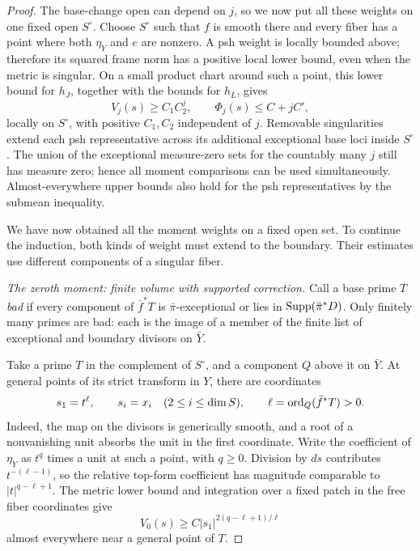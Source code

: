 \begin{proof}
The base-change open can depend on \(j\), so we now put all these
weights on one fixed open \(S^\circ\). Choose \(S^\circ\) such that
\(f\) is smooth there and every fiber has a point where both
\(\eta_Y\) and \(e\) are nonzero. A psh weight is locally bounded above;
therefore its squared frame norm has a positive local lower bound,
even when the metric is singular. On a small product chart around
such a point, this lower bound for \(h_J\), together with the
bounds for \(h_L\), gives
\begin{equation}\label{eq:common-open}
 V_j(s)\ge C_1C_2^j,\qquad \Phi_j(s)\le C+jC',
\end{equation}
locally on \(S^\circ\), with positive \(C_1,C_2\) independent of \(j\).
Removable singularities extend each psh representative across its
additional exceptional base loci inside \(S^\circ\).
The union of the exceptional measure-zero sets for the countably many
\(j\) still has measure zero; hence all moment comparisons can be used
simultaneously. Almost-everywhere upper bounds also hold for the psh
representatives by the submean inequality.

We have now obtained all the moment weights on a fixed open set.
To continue the induction, both kinds of weight must extend to the
boundary. Their estimates use different components of a singular fiber.

\medskip\noindent
\emph{The zeroth moment: finite volume with supported correction.}
Call a base prime \(T\) \emph{bad} if every component of
\(\bar f^*T\) is \(\bar\pi\)-exceptional or lies in
\(\operatorname{Supp}(\bar\pi^*D)\). Only finitely many primes are bad: each is the
image of a member of the finite list of exceptional and boundary
divisors on \(\bar Y\).

Take a prime \(T\) in the complement of \(S^\circ\), and a component
\(Q\) above it on \(\bar Y\). At general points of its strict transform
in \(Y\), there are coordinates
\[
 s_1=t^\ell,\qquad s_i=x_i\quad(2\le i\le\dim S),
 \qquad \ell=\operatorname{ord}_Q(\bar f^*T)>0 .
\]
Indeed, the map on the divisors is generically smooth, and a root of
a nonvanishing unit absorbs the unit in the first coordinate.
Write the coefficient of \(\eta_Y\) as \(t^q\) times a unit at such
a point, with \(q\ge0\). Division by \(ds\) contributes
\(t^{-(\ell-1)}\), so the relative top-form coefficient has magnitude
comparable to \(|t|^{q-\ell+1}\). The metric lower bound and integration
over a fixed patch in the free fiber coordinates give
\begin{equation}\label{eq:zero-bound}
 V_0(s)\ge C|s_1|^{2(q-\ell+1)/\ell}
\end{equation}
almost everywhere near a general point of \(T\).


\end{proof}
